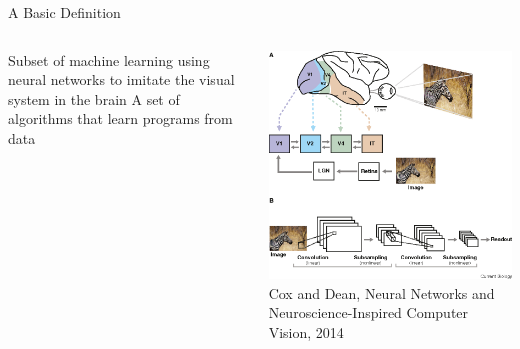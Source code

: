 \begin{frame}{A Basic Definition}
   \begin{columns}
      \centering
      \begin{column}{0.4\linewidth}
         \begin{baseitemize}
            \itemR Subset of machine learning using neural networks to imitate the visual system in the brain
            \vspace{0.45in}
            \itemR A set of algorithms that learn programs from data
         \end{baseitemize}
      \end{column}
      \begin{column}{0.6\linewidth}
         \centering
            \includegraphics[width=0.8\columnwidth]{images/visual-nn.png}\\
            \tiny{Cox and Dean, Neural Networks and Neuroscience-Inspired Computer Vision, 2014}
      \end{column}
   \end{columns}
\end{frame}


